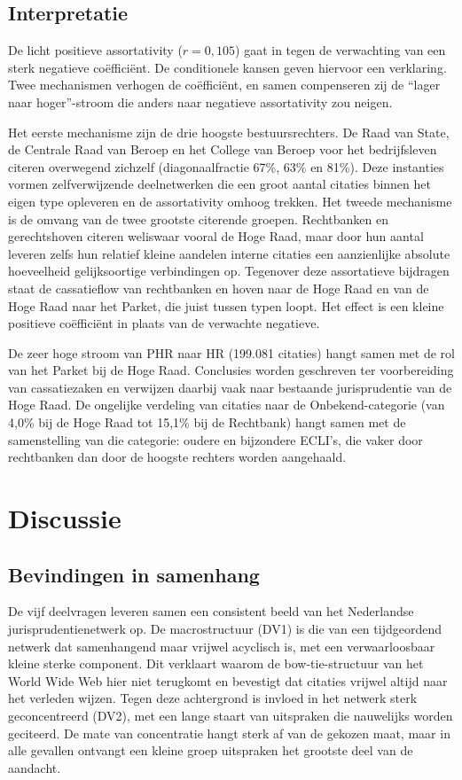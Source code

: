 \documentclass[a4paper, 12pt]{report}
\begin{document}
\section{Interpretatie}
De licht positieve assortativity ($r = 0{,}105$) gaat in tegen de verwachting van een sterk negatieve coëfficiënt. De conditionele kansen geven hiervoor een verklaring. Twee mechanismen verhogen de coëfficiënt, en samen compenseren zij de ``lager naar hoger''-stroom die anders naar negatieve assortativity zou neigen.

Het eerste mechanisme zijn de drie hoogste bestuursrechters. De Raad van State, de Centrale Raad van Beroep en het College van Beroep voor het bedrijfsleven citeren overwegend zichzelf (diagonaalfractie 67\%, 63\% en 81\%). Deze instanties vormen zelfverwijzende deelnetwerken die een groot aantal citaties binnen het eigen type opleveren en de assortativity omhoog trekken. Het tweede mechanisme is de omvang van de twee grootste citerende groepen. Rechtbanken en gerechtshoven citeren weliswaar vooral de Hoge Raad, maar door hun aantal leveren zelfs hun relatief kleine aandelen interne citaties een aanzienlijke absolute hoeveelheid gelijksoortige verbindingen op. Tegenover deze assortatieve bijdragen staat de cassatieflow van rechtbanken en hoven naar de Hoge Raad en van de Hoge Raad naar het Parket, die juist tussen typen loopt. Het effect is een kleine positieve coëfficiënt in plaats van de verwachte negatieve.

De zeer hoge stroom van PHR naar HR (199.081 citaties) hangt samen met de rol van het Parket bij de Hoge Raad. Conclusies worden geschreven ter voorbereiding van cassatiezaken en verwijzen daarbij vaak naar bestaande jurisprudentie van de Hoge Raad. De ongelijke verdeling van citaties naar de Onbekend-categorie (van 4,0\% bij de Hoge Raad tot 15,1\% bij de Rechtbank) hangt samen met de samenstelling van die categorie: oudere en bijzondere ECLI's, die vaker door rechtbanken dan door de hoogste rechters worden aangehaald. 


\chapter{Discussie}
\section{Bevindingen in samenhang}
De vijf deelvragen leveren samen een consistent beeld van het Nederlandse jurisprudentienetwerk op. De macrostructuur (DV1) is die van een tijdgeordend netwerk dat samenhangend maar vrijwel acyclisch is, met een verwaarloosbaar kleine sterke component.  Dit verklaart waarom de bow-tie-structuur van het World Wide Web hier niet terugkomt en bevestigt dat citaties vrijwel altijd naar het verleden wijzen. Tegen deze achtergrond is invloed in het netwerk sterk geconcentreerd (DV2), met een lange staart van uitspraken die nauwelijks worden geciteerd. De mate van concentratie hangt sterk af van de gekozen maat, maar in alle gevallen ontvangt een kleine groep uitspraken het grootste deel van de aandacht.
\end{document}
